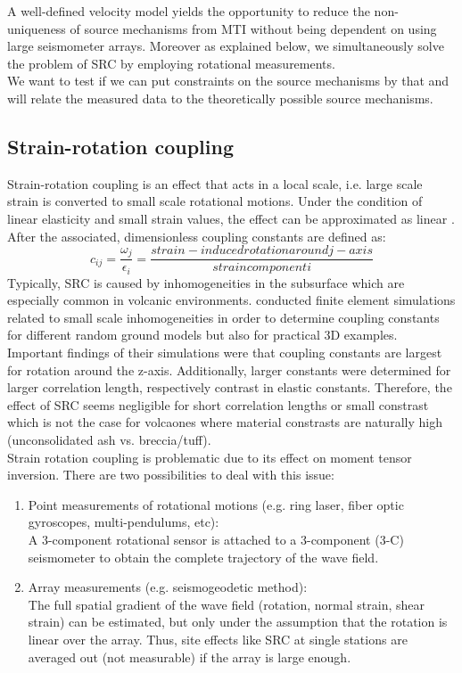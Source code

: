 \documentclass[12pt, a4paper]{article}
\begin{document}
A well-defined velocity model yields the opportunity to reduce the non-uniqueness of source mechanisms from MTI without being dependent on using large seismometer arrays. Moreover as explained below, we simultaneously solve the problem of SRC by employing rotational measurements.\\
We want to test if we can put constraints on the source mechanisms by that and will relate the measured data to the theoretically possible source mechanisms.


\subsection*{Strain-rotation coupling}
Strain-rotation coupling is an effect that acts in a local scale, i.e. large scale strain is converted to small scale rotational motions. Under the condition of linear elasticity and small strain values, the effect can be approximated as linear \citep{vanDriel2012}. After \citet{Harrison1976} the associated, dimensionless coupling constants are defined as:
\begin{equation}
	c_{ij} = \frac{\omega_j}{\epsilon_i} = \frac{strain-induced rotation around j-axis}{strain component i}
\end{equation} 
Typically, SRC is caused by inhomogeneities in the subsurface which are especially common in volcanic environments. \citet{vanDriel2012} conducted finite element simulations related to small scale inhomogeneities in order to determine coupling constants for different random ground models but also for practical 3D examples.\\
Important findings of their simulations were that coupling constants are largest for rotation around the z-axis. Additionally, larger constants were determined for larger correlation length, respectively contrast in elastic constants. Therefore, the effect of SRC seems negligible for short correlation lengths or small constrast which is not the case for volcaones where material constrasts are naturally high (unconsolidated ash vs. breccia/tuff).\\
Strain rotation coupling is problematic due to its effect on moment tensor inversion. There are two possibilities to deal with this issue:
\begin{enumerate}
	\singlespacing
	\item Point measurements of rotational motions (e.g. ring laser, fiber optic gyroscopes, multi-pendulums, etc):\\
	A 3-component rotational sensor is attached to a 3-component (3-C) seismometer to obtain the complete trajectory of the wave field.
	\item Array measurements (e.g. seismogeodetic method):\\
	The full spatial gradient of the wave field (rotation, normal strain, shear strain) can be estimated, but only under the assumption that the rotation is linear over the array. Thus, site effects like SRC at single stations are averaged out (not measurable) if the array is large enough.
\end{enumerate}
\end{document}
